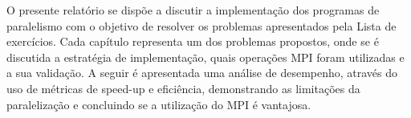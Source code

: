 O presente relatório se dispõe a discutir a implementação dos programas de paralelismo com o objetivo de resolver os problemas apresentados pela Lista de exercícios. Cada capítulo representa um dos problemas propostos, onde se é discutida a estratégia de implementação, quais operações MPI foram utilizadas e a sua validação. A seguir é apresentada uma análise de desempenho, através do uso de métricas de speed-up e eficiência, demonstrando as limitações da paralelização e concluindo se a utilização do MPI é vantajosa.
